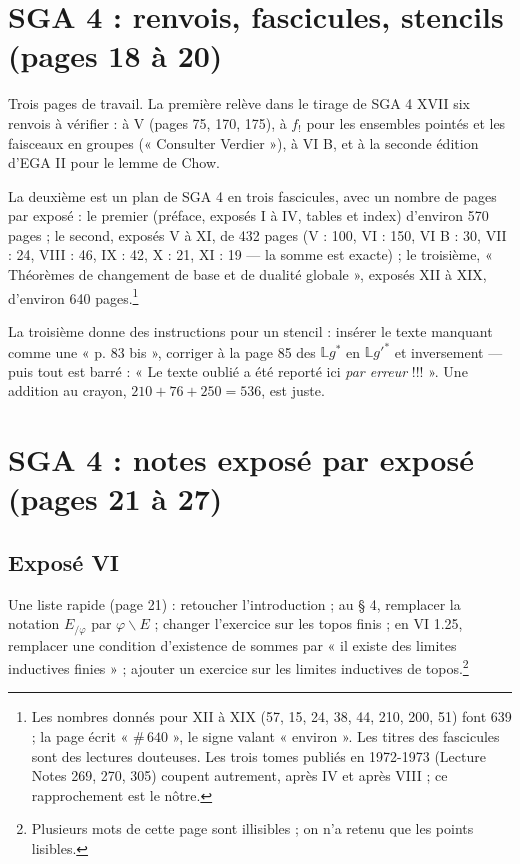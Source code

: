 \documentclass[11pt,a4paper]{article}
\begin{document}
\section*{SGA 4 : renvois, fascicules, stencils (pages 18 à 20)}

Trois pages de travail. La première relève dans le tirage de SGA 4 XVII six
renvois à vérifier : à V (pages 75, 170, 175), à $f_{!}$ pour les ensembles
pointés et les faisceaux en groupes (« Consulter Verdier »), à VI B, et à la
seconde édition d'EGA II pour le lemme de Chow.

La deuxième est un plan de SGA 4 en trois fascicules, avec un nombre de pages
par exposé : le premier (préface, exposés I à IV, tables et index) d'environ
570 pages ; le second, exposés V à XI, de 432 pages (V : 100, VI : 150, VI B :
30, VII : 24, VIII : 46, IX : 42, X : 21, XI : 19 --- la somme est exacte) ;
le troisième, « Théorèmes de changement de base et de dualité globale »,
exposés XII à XIX, d'environ 640 pages.\footnote{Les nombres donnés pour XII à
XIX (57, 15, 24, 38, 44, 210, 200, 51) font 639 ; la page écrit « $\#\,640$ »,
le signe valant « environ ». Les titres des fascicules sont des lectures
douteuses. Les trois tomes publiés en 1972-1973 (Lecture Notes 269, 270, 305)
coupent autrement, après IV et après VIII ; ce rapprochement est le nôtre.}

La troisième donne des instructions pour un stencil : insérer le texte
manquant comme une « p. 83 bis », corriger à la page 85 des
$\mathbb{L}g^{*}$ en $\mathbb{L}g'^{*}$ et inversement --- puis tout est
barré : « Le texte oublié a été reporté ici \emph{par erreur} !!! ». Une
addition au crayon, $210 + 76 + 250 = 536$, est juste.

\section*{SGA 4 : notes exposé par exposé (pages 21 à 27)}

\subsection*{Exposé VI}

Une liste rapide (page 21) : retoucher l'introduction ; au § 4, remplacer la
notation $E_{/\varphi}$ par $\varphi\backslash E$ ; changer l'exercice sur les
topos finis ; en VI 1.25, remplacer une condition d'existence de sommes par
« il existe des limites inductives finies » ; ajouter un exercice sur les
limites inductives de topos.\footnote{Plusieurs mots de cette page sont
illisibles ; on n'a retenu que les points lisibles.}
\end{document}
